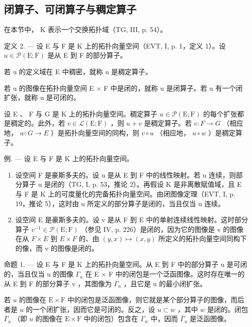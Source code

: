 \subsection{闭算子、可闭算子与稠定算子}

在本节中， K 表示一个交换拓扑域（TG, III, p. 54）。

定义 2. --- 设 E 与 F 是 K 上的拓扑向量空间（EVT, I, p. 1，定义 1）。设 \(u \in \mathcal{P}(\mathrm{E};\mathrm{F})\) 是从 E 到 F 的部分算子。

若 u 的定义域在 E 中稠密，就称 u 是稠定算子。

若 u 的图像在拓扑向量空间 E × F 中是闭的，就称 u 是闭算子。若 u 有一个闭扩张，就称 u 是可闭的。

设 E 、 F 与 G 是 K 上的拓扑向量空间。稠定算子 \(u \in \mathcal{P}(\mathrm{E};\mathrm{F})\) 的每个扩张都是稠定的。此外，若 \(v \in \mathcal{L}(\mathrm{E};\mathrm{F})\) ，则 \(u + v\) 是稠定算子。若 \(v: F \to G\) （相应地， \(w: G \to E\) ）是拓扑向量空间的同构，则 \(v \circ u\) （相应地， \(u \circ w\) ）是稠定算子。

例. --- 设 E 与 F 是 K 上的拓扑向量空间。

\begin{enumerate}
\def\labelenumi{\arabic{enumi})}
\item
  设空间 F 是豪斯多夫的。设 u 是从 E 到 F 中的线性映射。若 u 连续，则部分算子 u 是闭的（TG, I, p. 53，推论 2）。再假设 K 是非离散赋值域，且 E 与 F 是 K 上的可度量化的完备拓扑向量空间。由闭图像定理（EVT, I, p. 19，推论 5），这时由 u 所定义的部分算子是闭的，当且仅当 u 连续。
\item
  设空间 E 是豪斯多夫的。设 v 是从 F 到 E 中的单射连续线性映射。这时部分算子 \(v^{-1} \in \mathcal{P}(\mathrm{E};\mathrm{F})\) （参见 IV, p. 226）是闭的，因为它的图像是 v 的图像在从 \(F \times E\) 到 \(E \times F\) 的、由 \((y,x) \mapsto (x,y)\) 所定义的拓扑向量空间同构下的像，而 v 的图像是闭的。
\end{enumerate}

命题 1. --- 设 E 与 F 是 K 上的拓扑向量空间。从 E 到 F 中的部分算子 u 是可闭的，当且仅当 u 的图像 \(\Gamma_{u}\) 在 E × F 中的闭包是一个泛函图像。这时存在唯一的从 E 到 F 的部分算子 v ，其图像为 \(\overline{\Gamma}_{u}\) ，且它是 u 的最小闭扩张。

若 \(u\) 的图像在 \(\mathrm{E} \times \mathrm{F}\) 中的闭包是泛函图像，则它就是某个部分算子的图像，而后者是 \(u\) 的一个闭扩张，因而它是可闭的。反之，设 \(u \subset w\) ，其中 \(w\) 是闭的。闭包 \(\overline{\Gamma}_u\) （即 \(u\) 的图像在 \(\mathrm{E} \times \mathrm{F}\) 中的闭包）包含在 \(\Gamma_w\) 中，因而 \(\overline{\Gamma}_u\) 是泛函图像。

